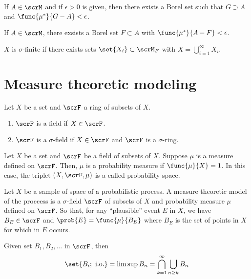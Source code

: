 \begin{lemma}
    If \(A \in \scrM\) and if \(\epsilon > 0\) is given, then there exists a Borel set such that \(G \supset A\) and \(\func{\mu^{\ast}}{G - A} < \epsilon\).
\end{lemma}

\begin{lemma}
    If \(A \in \scrM\), there exsists a Borel set \(F \subset A\) with \(\func{\mu^{\ast}}{A - F} < \epsilon\).
\end{lemma}

\begin{definition}
    \(X\) is \(\sigma\)-finite if there exists sets \(\set{X_i} \subset \scrM_F\) with \(X = \bigcup_{i = 1}^{\infty} X_i\).
\end{definition}

\section{Measure theoretic modeling}
\begin{definition}
    Let \(X\) be a set and \(\scrF\) a ring of subsets of \(X\).
    \begin{enumerate}
        \item \(\scrF\) is a field if \(X \in \scrF\).
        \item \(\scrF\) is a \(\sigma\)-field if \(X \in \scrF\) and \(\scrF\) is a \(\sigma\)-ring.
    \end{enumerate}
\end{definition}

\begin{definition}
    Let \(X\) be a set and \(\scrF\) be a field of subsets of \(X\). Suppose \(\mu\) is a measure defined on \(\scrF\). Then, \(\mu\) is a probability measure if \(\func{\mu}{X} = 1\). In this case, the triplet \((X,\scrF,\mu)\) is a called probability space.
\end{definition}

Let \(X\) be a sample of space of a probabilistic process. A measure theoretic model of the proccess is a \(\sigma\)-field \(\scrF\) of subsets of \(X\) and probability measure \(\mu\) defined on \(\scrF\). So that, for any ``plausible'' event \(E\) in \(X\), we have \(B_E \in \scrF\) and \(\prob{E} =\func{\mu}{B_E}\) where \(B_E\) is the set of points in \(X\) for which in \(E\) occurs.

\begin{definition}
    Given set \(B_1, B_2 , \dots\) in \(\scrF\), then 
    \begin{equation*}
        \set{B_i; \ \mathrm{ i.o.}} = \limsup B_n = \bigcap_{k = 1}^{\infty} \bigcup_{n \geq k} B_n
    \end{equation*}
\end{definition}

